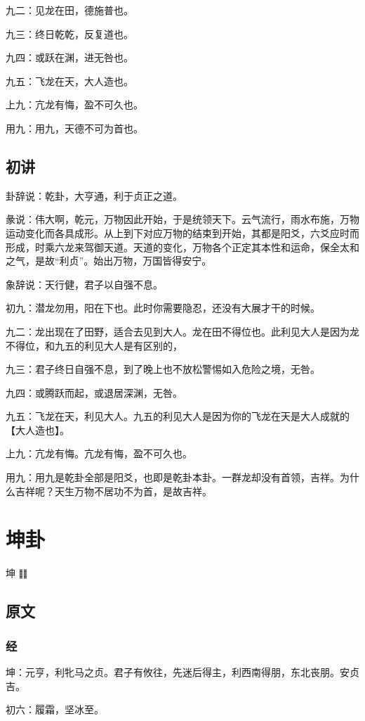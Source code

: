 \documentclass[12pt,oneside]{book}
\begin{document}
九二：见龙在田，德施普也。

九三：终日乾乾，反复道也。

九四：或跃在渊，进无咎也。

九五：飞龙在天，大人造也。

上九：亢龙有悔，盈不可久也。

用九：用九，天德不可为首也。


\section{初讲}
卦辞说：乾卦，大亨通，利于贞正之道。

彖说：伟大啊，乾元，万物因此开始，于是统领天下。云气流行，雨水布施，万物运动变化而各具成形。从上到下对应万物的结束到开始，其都是阳爻，六爻应时而形成，时乘六龙来驾御天道。天道的变化，万物各个正定其本性和运命，保全太和之气，是故“利贞”。始出万物，万国皆得安宁。

象辞说：天行健，君子以自强不息。

初九：潜龙勿用，阳在下也。此时你需要隐忍，还没有大展才干的时候。

九二：龙出现在了田野，适合去见到大人。龙在田不得位也。此利见大人是因为龙不得位，和九五的利见大人是有区别的，

九三：君子终日自强不息，到了晚上也不放松警惕如入危险之境，无咎。

九四：或腾跃而起，或退居深渊，无咎。

九五：飞龙在天，利见大人。九五的利见大人是因为你的飞龙在天是大人成就的【大人造也】。

上九：亢龙有悔。亢龙有悔，盈不可久也。

用九：用九是乾卦全部是阳爻，也即是乾卦本卦。一群龙却没有首领，吉祥。为什么吉祥呢？天生万物不居功不为首，是故吉祥。


\chapter{坤卦}
坤 {\Large ䷁}

\section{原文}
\subsection{经}
坤：元亨，利牝马之贞。君子有攸往，先迷后得主，利西南得朋，东北丧朋。安贞吉。

初六：履霜，坚冰至。
\end{document}
